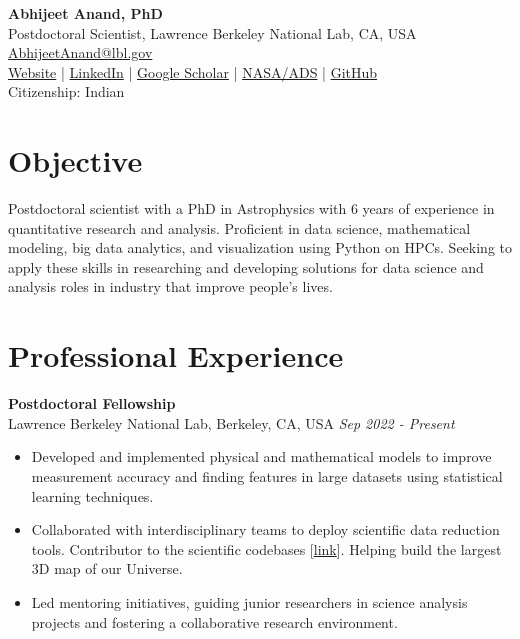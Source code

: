\documentclass[a4paper,10pt]{article}
\begin{document}
\begin{center}
    {\LARGE \textbf{Abhijeet Anand, PhD}} \\
    Postdoctoral Scientist, Lawrence Berkeley National Lab, CA, USA \\
    \href{mailto:AbhijeetAnand@lbl.gov}{AbhijeetAnand@lbl.gov} \\
     \href{https://abhi0395.github.io/}{Website}  | \href{https://www.linkedin.com/in/abhijeet-anand-iisc}{LinkedIn} | \href{https://scholar.google.com/citations?hl=en&user=MfOuq1IAAAAJ}{Google Scholar} | \href{https://ui.adsabs.harvard.edu/public-libraries/YPXGQEsNQg-zR9R9YBYFXw}{NASA/ADS} | \href{https://github.com/abhi0395}{GitHub}\\
    Citizenship: Indian\\
\end{center}

\vspace{0.5cm}

\section*{Objective}
Postdoctoral scientist with a PhD in Astrophysics with 6 years of experience in quantitative research and analysis.
Proficient in data science, mathematical modeling, big data analytics, and visualization using Python on HPCs. Seeking to
apply these skills in researching and developing solutions for data science and analysis roles in industry that improve people's lives.

\section*{Professional Experience}
\noindent
\textbf{Postdoctoral Fellowship} \\
Lawrence Berkeley National Lab, Berkeley, CA, USA \hfill \textit{Sep 2022 - Present} \\
\begin{itemize}[noitemsep, topsep=0pt]
    \item Developed and implemented physical and mathematical models to improve measurement accuracy and finding features in large datasets using statistical learning techniques. 
     \item Collaborated with interdisciplinary teams to deploy scientific data reduction tools. Contributor to the scientific codebases [\href{https://github.com/desihub}{link}]. Helping build the largest 3D map of our Universe.
        \item Led mentoring initiatives, guiding junior researchers in science analysis projects and fostering a collaborative research environment.
\end{itemize}
\end{document}
